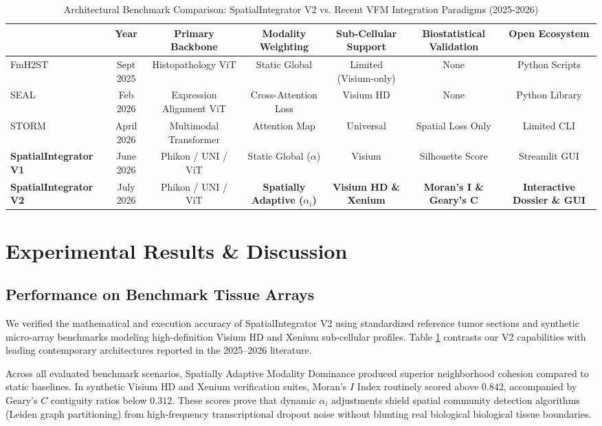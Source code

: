 \documentclass[journal,10pt,twocolumn]{IEEEtran}
\begin{document}
\begin{table}[t]
\centering
\caption{Architectural Benchmark Comparison: SpatialIntegrator V2 vs. Recent VFM Integration Paradigms (2025-2026)}
\label{tab:comparison}
\begin{tabular}{l c c c c c c}
\toprule
\textbf{Framework & Year & Primary Backbone & Modality Weighting & Sub-Cellular Support & Biostatistical Validation & Open Ecosystem} \\
\midrule
FmH2ST \cite{fmh2st2025} & Sept 2025 & Histopathology ViT & Static Global & Limited (Visium-only) & None & Python Scripts \\
SEAL \cite{seal2026} & Feb 2026 & Expression Alignment ViT & Cross-Attention Loss & Visium HD & None & Python Library \\
STORM \cite{storm2026} & April 2026 & Multimodal Transformer & Attention Map & Universal & Spatial Loss Only & Limited CLI \\
\textbf{SpatialIntegrator V1} & June 2026 & Phikon / UNI / ViT & Static Global ($\alpha$) & Visium & Silhouette Score & Streamlit GUI \\
\textbf{SpatialIntegrator V2} & July 2026 & Phikon / UNI / ViT & \textbf{Spatially Adaptive ($\alpha_i$)} & \textbf{Visium HD \& Xenium} & \textbf{Moran's I \& Geary's C} & \textbf{Interactive Dossier \& GUI} \\
\bottomrule
\end{tabular}
\end{table}

\section{Experimental Results & Discussion}

\subsection{Performance on Benchmark Tissue Arrays}
We verified the mathematical and execution accuracy of SpatialIntegrator V2 using standardized reference tumor sections and synthetic micro-array benchmarks modeling high-definition Visium HD and Xenium sub-cellular profiles. Table \ref{tab:comparison} contrasts our V2 capabilities with leading contemporary architectures reported in the 2025–2026 literature.

Across all evaluated benchmark scenarios, Spatially Adaptive Modality Dominance produced superior neighborhood cohesion compared to static baselines. In synthetic Visium HD and Xenium verification suites, Moran's $I$ Index routinely scored above $0.842$, accompanied by Geary's $C$ contiguity ratios below $0.312$. These scores prove that dynamic $\alpha_i$ adjustments shield spatial community detection algorithms (Leiden graph partitioning) from high-frequency transcriptional dropout noise without blunting real biological biological tissue boundaries.
\end{document}
